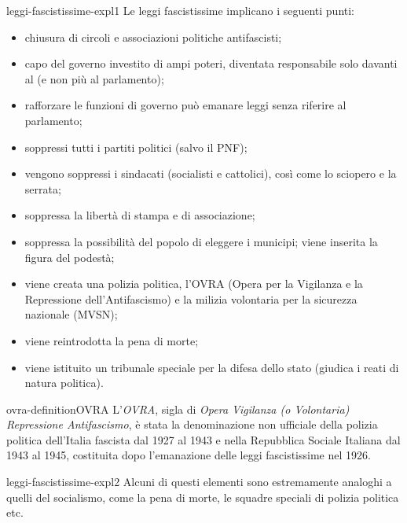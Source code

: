 \documentclass[preview]{standalone}
\begin{document}
\begin{snippet}{leggi-fascistissime-expl1}
    Le leggi fascistissime implicano i seguenti punti:
    \begin{itemize}
        \item chiusura di circoli e associazioni politiche antifascisti;
        \item capo del governo investito di ampi poteri, diventata responsabile solo davanti al (e non più al parlamento);
        \item rafforzare le funzioni di governo può emanare leggi senza riferire al parlamento;
        \item soppressi tutti i partiti politici (salvo il PNF);
        \item vengono soppressi i sindacati (socialisti e cattolici), così come lo sciopero e la serrata;
        \item soppressa la libertà di stampa e di associazione;
        \item soppressa la possibilità del popolo di eleggere i municipi; viene inserita la figura del podestà;
        \item viene creata una polizia politica, l'OVRA (Opera per la Vigilanza e la Repressione dell'Antifascismo)
            e la milizia volontaria per la sicurezza nazionale (MVSN);
        \item viene reintrodotta la pena di morte;
        \item viene istituito un tribunale speciale per la difesa dello stato (giudica i reati di natura politica).
    \end{itemize}
\end{snippet}

\begin{snippetdefinition}{ovra-definition}{OVRA}
    L'\textit{OVRA}, sigla di \textit{Opera Vigilanza (o Volontaria) Repressione Antifascismo},
    è stata la denominazione non ufficiale della polizia politica dell'Italia fascista dal 1927 al 1943 e
    nella Repubblica Sociale Italiana dal 1943 al 1945, costituita dopo l'emanazione delle leggi fascistissime nel 1926. 
\end{snippetdefinition}

\begin{snippet}{leggi-fascistissime-expl2}
    Alcuni di questi elementi sono estremamente analoghi a quelli del socialismo, come la pena di morte,
    le squadre speciali di polizia politica etc.
\end{snippet}

\end{document}
